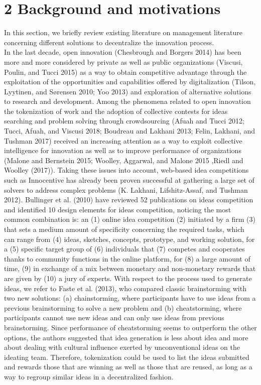 \documentclass[]{elsarticle} %
\begin{document}
\section{2 Background and motivations}\label{background-and-motivations}

In this section, we briefly review existing literature on management
literature concerning different solutions to decentralize the innovation
process.\\
In the last decade, open innovation (Chesbrough and Borgers 2014) has
been more and more considered by private as well as public organizations
(Viscusi, Poulin, and Tucci 2015) as a way to obtain competitive
advantage through the exploitation of the opportunities and capabilities
offered by digitalization (Tilson, Lyytinen, and Sørensen 2010; Yoo
2013) and exploration of alternative solutions to research and
development. Among the phenomena related to open innovation the
tokenization of work and the adoption of collective contests for ideas
searching and problem solving through crowdsourcing (Afuah and Tucci
2012; Tucci, Afuah, and Viscusi 2018; Boudreau and Lakhani 2013; Felin,
Lakhani, and Tushman 2017) received an increasing attention as a way to
exploit collective intelligence for innovation as well as to improve
performance of organizations (Malone and Bernstein 2015; Woolley,
Aggarwal, and Malone 2015 ,Riedl and Woolley (2017)). Taking these
issues into account, web-based idea competitions such as Innocentive has
already been proven successful at gathering a large set of solvers to
address complex problems (K. Lakhani, Lifshitz-Assaf, and Tushman 2012).
Bullinger et al. (2010) have reviewed 52 publications on ideas
competition and identified 10 design elements for ideas competition,
noticing the most common combination is: an (1) online idea competition
(2) initiated by a firm (3) that sets a medium amount of specificity
concerning the required tasks, which can range from (4) ideas, sketches,
concepts, prototype, and working solution, for a (5) specific target
group of (6) individuals that (7) competes and cooperates thanks to
community functions in the online platform, for (8) a large amount of
time, (9) in exchange of a mix between monetary and non-monetary rewards
that are given by (10) a jury of experts. With respect to the process
used to generate ideas, we refer to Faste et al. (2013), who compared
classic brainstorming with two new solutions: (a) chainstorming, where
participants have to use ideas from a previous brainstorming to solve a
new problem and (b) cheatstorming, where participants cannot use new
ideas and can only use ideas from previous brainstorming. Since
performance of cheatstorming seems to outperform the other options, the
authors suggested that idea generation is less about idea and more about
dealing with cultural influence exerted by unconventional ideas on the
ideating team. Therefore, tokenization could be used to list the ideas
submitted and rewards those that are winning as well as those that are
reused, as long as a way to regroup similar ideas in a decentralized
fashion.
\end{document}

